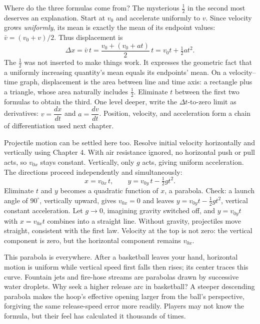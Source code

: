 \begin{mathbridge}
Where do the three formulas come from? The mysterious \(\tfrac12\) in the second most deserves an explanation. Start at \(v_0\) and accelerate uniformly to \(v\). Since velocity grows \emph{uniformly}, its mean is exactly the mean of its endpoint values: \(\bar v=(v_0+v)/2\). Thus displacement is
\[
  \Delta x=\bar v\,t=\frac{v_0+(v_0+at)}{2}\,t=v_0 t+\tfrac12 a t^2.
\]
The \(\tfrac12\) was not inserted to make things work. It expresses the geometric fact that a uniformly increasing quantity's mean equals its endpoints' mean. On a velocity--time graph, displacement is the area between line and time axis: a rectangle plus a triangle, whose area naturally includes \(\tfrac12\). Eliminate \(t\) between the first two formulas to obtain the third. One level deeper, write the \(\Delta t\)-to-zero limit as derivatives: \(v=\dfrac{dx}{dt}\) and \(a=\dfrac{dv}{dt}\). Position, velocity, and acceleration form a chain of differentiation used next chapter.

Projectile motion can be settled here too. Resolve initial velocity horizontally and vertically using Chapter 4. With air resistance ignored, no horizontal push or pull acts, so \(v_{0x}\) stays constant. Vertically, only \(g\) acts, giving uniform acceleration. The directions proceed independently and simultaneously:
\[
  x=v_{0x}\,t,\qquad y=v_{0y}\,t-\tfrac12 g t^2.
\]
Eliminate \(t\) and \(y\) becomes a quadratic function of \(x\), a parabola. Check: a launch angle of \(90^\circ\), vertically upward, gives \(v_{0x}=0\) and leaves \(y=v_{0y}t-\tfrac12gt^2\), vertical constant acceleration. Let \(g\to0\), imagining gravity switched off, and \(y=v_{0y}t\) with \(x=v_{0x}t\) combines into a straight line. Without gravity, projectiles move straight, consistent with the first law. Velocity at the top is not zero: the vertical component is zero, but the horizontal component remains \(v_{0x}\).

This parabola is everywhere. After a basketball leaves your hand, horizontal motion is uniform while vertical speed first falls then rises; its center traces this curve. Fountain jets and fire-hose streams are parabolas drawn by successive water droplets. Why seek a higher release arc in basketball? A steeper descending parabola makes the hoop's effective opening larger from the ball's perspective, forgiving the same release-speed error more readily. Players may not know the formula, but their feel has calculated it thousands of times.
\end{mathbridge}

